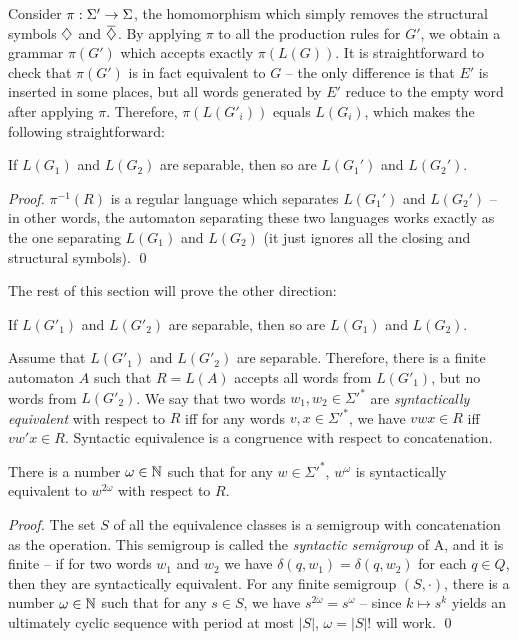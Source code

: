 \documentclass{article}
\begin{document}
Consider $\pi: \Sigma' \rightarrow \Sigma$, the homomorphism which simply
removes the structural symbols $\diamondsuit$ and $\ca$. By applying
$\pi$ to all the production rules for $G'$, we obtain a grammar $\pi(G')$ which
accepts exactly $\pi(L(G))$. It is straightforward to check that $\pi(G')$ is
in fact equivalent to $G$ -- the only difference is that $E'$ is inserted in some
places, but all words generated by $E'$ reduce to the empty word after applying $\pi$.
Therefore, $\pi(L(G'_i))$ equals $L(G_i)$, which makes the following straightforward:

\begin{lemma}\label{easydir}
If $L(G_1)$ and $L(G_2)$ are separable, then so are $L(G_1')$ and $L(G_2')$.
\end{lemma}

\begin{proof}
$\pi^{-1}(R)$ is a regular language
which separates $L(G_1')$ and $L(G_2')$ -- in other words, the automaton separating
these two languages works exactly as the one separating $L(G_1)$ and $L(G_2)$
(it just ignores all the closing and structural symbols). \qed
\end{proof}

The rest of this section will prove the other direction:

\begin{theorem}\label{harddir}
If $L(G'_1)$ and $L(G'_2)$ are separable, then so are $L(G_1)$ and $L(G_2)$.
\end{theorem}

Assume that $L(G'_1)$ and $L(G'_2)$ are separable. Therefore, there is a finite automaton
$A$ such that $R = L(A)$ accepts all words from $L(G'_1)$, but no words from $L(G'_2)$. We say
that two words $w_1, w_2 \in \Sigma'^*$ are {\it syntactically equivalent} with respect to $R$
iff for any words $v, x \in \Sigma'^*$, we have $vwx\in R$ iff $vw'x \in R$.
Syntactic equivalence is a congruence with respect to concatenation.

\begin{lemma}\label{semigroup}
There is a number $\omega \in {\mathbb N}$ such that for any $w \in \Sigma'^*$,
$w^\omega$ is syntactically equivalent to $w^{2\omega}$ with respect to $R$.
\end{lemma}

\begin{proof}
The set $S$ of all the equivalence classes
is a semigroup with concatenation as the operation. This semigroup is called the
\emph{syntactic semigroup} of A, and it is finite -- if for 
two words $w_1$ and $w_2$ we have $\delta(q,w_1) = \delta(q,w_2)$ for each $q \in Q$,
then they are syntactically equivalent.
For any finite semigroup $(S, \cdot)$, there is a number $\omega \in {\mathbb N}$ such that 
for any $s \in S$, we have $s^{2\omega} = s^\omega$ -- since $k \mapsto s^k$
yields an ultimately cyclic sequence with period at most $|S|$, 
$\omega = |S|!$ will work. \qed
\end{proof}
\end{document}

